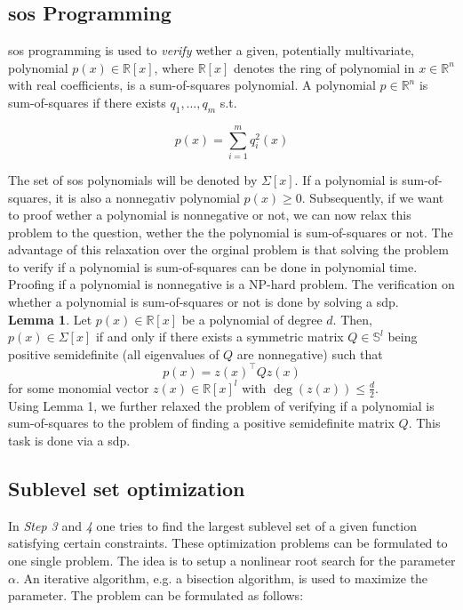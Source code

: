 \documentclass[10pt,a4paper]{article}
\begin{document}
\subsection{\gls{sos} Programming \cite{cunis_loureiro2023}}
\gls{sos} programming is used to \textit{verify} wether a given, potentially multivariate, polynomial $p(x) \in \mathbb{R}[x]$, where $\mathbb{R}[x]$ denotes
the ring of polynomial in $x \in \mathbb{R}^n$ with real coefficients, is a sum-of-squares polynomial. A polynomial $p \in \mathbb{R}^n$ is sum-of-squares if
there exists $q_1, \dots, q_m$ s.t.

\begin{equation}
	p(x)=\sum_{i=1}^m q_i^2(x)
\end{equation}

The set of \gls{sos} polynomials will be denoted by $\Sigma[x]$. If a polynomial is sum-of-squares, it is also a nonnegativ polynomial $p(x) \geq 0$.
Subsequently, if we want to proof wether a polynomial is nonnegative or not, we can now relax this problem to the question, wether the the polynomial
is sum-of-squares or not. The advantage of this relaxation over the orginal problem is that solving the problem to verify if a polynomial is 
sum-of-squares can be done in polynomial time. Proofing if a polynomial is nonnegative is a NP-hard problem. The verification on whether a polynomial
is sum-of-squares or not is done by solving a \gls{sdp}.\\

\textbf{Lemma 1}. Let $p(x) \in \mathbb{R}[x]$ be a polynomial of degree $d$. Then, $p(x) \in \Sigma[x]$ if and only if there exists a symmetric
matrix $Q \in \mathbb{S}^l$ being positive semidefinite (all eigenvalues of $Q$ are nonnegative) such that
\begin{equation}
	p(x)=z(x)^{\top} Q z(x)
\end{equation}
for some monomial vector $z(x) \in \mathbb{R}[x]^l$ with $\operatorname{deg}(z(x)) \leq \frac{d}{2}$.\\

Using Lemma 1, we further relaxed the problem of verifying if a polynomial is sum-of-squares to the problem of finding a positive semidefinite matrix $Q$.
This task is done via a \gls{sdp}. 



\subsection{Sublevel set optimization}
In \textit{Step 3} and \textit{4} one tries to find the largest sublevel set of a given function satisfying certain constraints. These optimization problems
can be formulated to one single problem. The idea is to setup a nonlinear root search for the parameter $\alpha$. An iterative 
algorithm, e.g. a bisection algorithm, is used to maximize the parameter. The problem can be formulated as follows:
\end{document}
